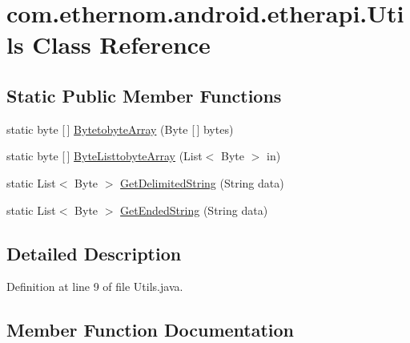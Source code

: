 \hypertarget{classcom_1_1ethernom_1_1android_1_1etherapi_1_1_utils}{}\section{com.\+ethernom.\+android.\+etherapi.\+Utils Class Reference}
\label{classcom_1_1ethernom_1_1android_1_1etherapi_1_1_utils}
\subsection*{Static Public Member Functions}
\begin{DoxyCompactItemize}
\item 
static byte \mbox{[}$\,$\mbox{]} \mbox{\hyperlink{classcom_1_1ethernom_1_1android_1_1etherapi_1_1_utils_acb76bf0189f4655b3405298263a1e1f2}{Bytetobyte\+Array}} (Byte \mbox{[}$\,$\mbox{]} bytes)
\item 
static byte \mbox{[}$\,$\mbox{]} \mbox{\hyperlink{classcom_1_1ethernom_1_1android_1_1etherapi_1_1_utils_a9a9518eff31b31c6a2b3d432a4f40d0a}{Byte\+Listtobyte\+Array}} (List$<$ Byte $>$ in)
\item 
static List$<$ Byte $>$ \mbox{\hyperlink{classcom_1_1ethernom_1_1android_1_1etherapi_1_1_utils_a7fdfdf6496150b6b9b12ed214796f84a}{Get\+Delimited\+String}} (String data)
\item 
static List$<$ Byte $>$ \mbox{\hyperlink{classcom_1_1ethernom_1_1android_1_1etherapi_1_1_utils_a5ba18811e4d78758336b140c58f2683f}{Get\+Ended\+String}} (String data)
\end{DoxyCompactItemize}


\subsection{Detailed Description}


Definition at line 9 of file Utils.\+java.



\subsection{Member Function Documentation}
\mbox{\label{classcom_1_1ethernom_1_1android_1_1etherapi_1_1_utils_a9a9518eff31b31c6a2b3d432a4f40d0a}} 
